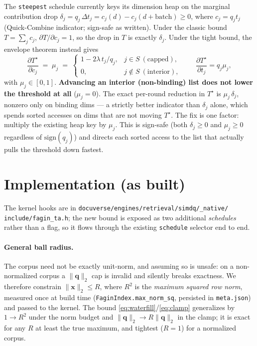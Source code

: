 \documentclass[11pt,a4paper]{article}
\newcommand{\qv}{\mathbf{q}}
\newcommand{\xv}{\mathbf{x}}
\newcommand{\norm}[1]{\lVert #1 \rVert}
\begin{document}
The \texttt{steepest} schedule currently keys its dimension heap on the marginal
contribution drop $\delta_j=q_j\,\Delta t_j = c_j(d)-c_j(d{+}\text{batch})\ge0$,
where $c_j=q_j t_j$ (Quick-Combine indicator; sign-safe as written). Under the
classic bound $T=\sum_j c_j$, $\partial T/\partial c_j=1$, so the drop in $T$ is
exactly $\delta_j$. Under the tight bound, the envelope theorem instead gives
\begin{equation}
  \frac{\partial T^\star}{\partial c_j} \;=\; \mu_j \;=\;
  \begin{cases}
    1-2\lambda\,t_j/q_j, & j\in S \ (\text{capped}),\\[2pt]
    0, & j\notin S \ (\text{interior}),
  \end{cases}
  \qquad
  \frac{\partial T^\star}{\partial t_j}=q_j\mu_j,
  \label{eq:envelope}
\end{equation}
with $\mu_j\in[0,1]$. \textbf{Advancing an interior (non-binding) list does not
lower the threshold at all} ($\mu_j=0$). The exact per-round reduction in
$T^\star$ is $\mu_j\,\delta_j$, nonzero only on binding dims --- a strictly better
indicator than $\delta_j$ alone, which spends sorted accesses on dims that are
not moving $T^\star$. The fix is one factor: multiply the existing heap key by
$\mu_j$. This is sign-safe (both $\delta_j\ge0$ and $\mu_j\ge0$ regardless of
$\mathrm{sign}(q_j)$) and directs each sorted access to the list that actually
pulls the threshold down fastest.

\section{Implementation (as built)}

The kernel hooks are in \texttt{docuverse/engines/retrieval/simdq/\_native/%
include/fagin\_ta.h}; the new bound is exposed as two additional
\emph{schedules} rather than a flag, so it flows through the existing
\texttt{schedule} selector end to end.

\paragraph{General ball radius.} The corpus need not be exactly unit-norm, and
assuming so is unsafe: on a non-normalized corpus a $\norm{\qv}_2$ cap is invalid
and silently breaks exactness. We therefore constrain $\norm{\xv}_2\le R$, where
$R^2$ is the \emph{maximum squared row norm}, measured once at build time
(\texttt{FaginIndex.max\_norm\_sq}, persisted in \texttt{meta.json}) and passed
to the kernel. The bound \eqref{eq:waterfill}/\eqref{eq:clamp} generalizes by
$1\!\to\!R^2$ under the norm budget and $\norm{\qv}_2\!\to\!R\norm{\qv}_2$ in the
clamp; it is exact for any $R$ at least the true maximum, and tightest ($R=1$)
for a normalized corpus.
\end{document}
